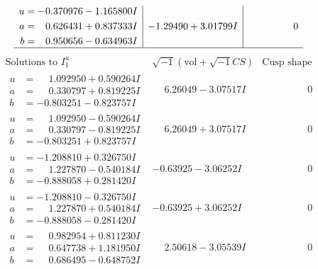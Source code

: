 \documentclass[1p]{elsarticle_modified}
\theoremstyle{definition}
\newcommand{\I}{\sqrt{-1}}
\begin{document}
$$\begin{array}{c|c|c}
\begin{aligned}
u &= -0.370976 - 1.165800 I \\
a &= \phantom{-}0.626431 + 0.837333 I \\
b &= \phantom{-}0.950656 - 0.634963 I\end{aligned}
 & -1.29490 + 3.01799 I & \phantom{-0.000000 } 0\\
 \hline 
 \end{array}$$\newpage$$\begin{array}{c|c|c}  
\text{Solutions to }I^u_{1}& \I (\text{vol} + \sqrt{-1}CS) & \text{Cusp shape}\\
 \hline 
\begin{aligned}
u &= \phantom{-}1.092950 + 0.590264 I \\
a &= \phantom{-}0.330797 + 0.819225 I \\
b &= -0.803251 - 0.823757 I\end{aligned}
 & \phantom{-}6.26049 - 3.07517 I & \phantom{-0.000000 } 0 \\ \hline\begin{aligned}
u &= \phantom{-}1.092950 - 0.590264 I \\
a &= \phantom{-}0.330797 - 0.819225 I \\
b &= -0.803251 + 0.823757 I\end{aligned}
 & \phantom{-}6.26049 + 3.07517 I & \phantom{-0.000000 } 0 \\ \hline\begin{aligned}
u &= -1.208810 + 0.326750 I \\
a &= \phantom{-}1.227870 - 0.540184 I \\
b &= -0.888058 + 0.281420 I\end{aligned}
 & -0.63925 - 3.06252 I & \phantom{-0.000000 } 0 \\ \hline\begin{aligned}
u &= -1.208810 - 0.326750 I \\
a &= \phantom{-}1.227870 + 0.540184 I \\
b &= -0.888058 - 0.281420 I\end{aligned}
 & -0.63925 + 3.06252 I & \phantom{-0.000000 } 0 \\ \hline\begin{aligned}
u &= \phantom{-}0.982954 + 0.811230 I \\
a &= \phantom{-}0.647738 + 1.181950 I \\
b &= \phantom{-}0.686495 - 0.648752 I\end{aligned}
 & \phantom{-}2.50618 - 3.05539 I & \phantom{-0.000000 } 0 \\ \hline\begin{aligned}

\end{aligned}
\end{array}$$
\end{document}
